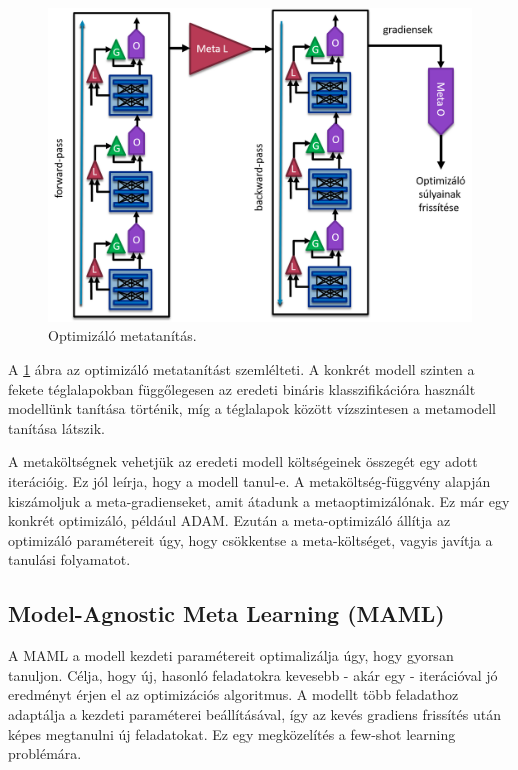 \begin{figure}[!ht]
	\centering
	\includegraphics[width=120mm, keepaspectratio]{figures/meta-opt.png}
	\caption{Optimizáló metatanítás.}
	\label{fig:meta-opt}
\end{figure}

A \ref{fig:meta-opt} ábra az optimizáló metatanítást szemlélteti. A konkrét modell szinten  a fekete téglalapokban függőlegesen az eredeti bináris klasszifikációra használt modellünk tanítása történik, míg a téglalapok között vízszintesen a metamodell tanítása látszik.

A metaköltségnek vehetjük az eredeti modell költségeinek összegét egy adott iterációig. Ez jól leírja, hogy a modell tanul-e. A metaköltség-függvény alapján kiszámoljuk a meta-gradienseket, amit átadunk a metaoptimizálónak. Ez már egy konkrét optimizáló, például ADAM. Ezután a meta-optimizáló állítja az optimizáló paramétereit úgy, hogy csökkentse a meta-költséget, vagyis javítja a tanulási folyamatot. 

\subsection{Model-Agnostic Meta Learning (MAML)}


A MAML a modell kezdeti paramétereit optimalizálja úgy, hogy gyorsan tanuljon. Célja, hogy új, hasonló feladatokra kevesebb - akár egy - iterációval jó eredményt érjen el az optimizációs algoritmus. A modellt több feladathoz adaptálja a kezdeti paraméterei beállításával, így az kevés gradiens frissítés után képes megtanulni új feladatokat. Ez egy megközelítés a few-shot learning problémára.



